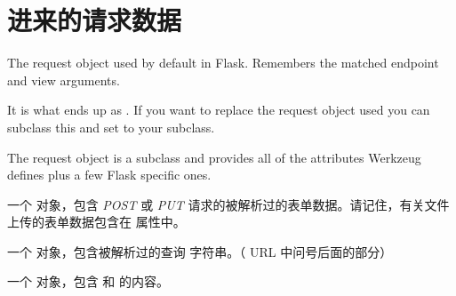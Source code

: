 \documentclass[a4paper,12pt]{sphinxmanual}
\begin{document}
\section{进来的请求数据}
\label{api:id4}

\begin{fulllineitems}
\label{api:flask.Request}
The request object used by default in Flask.  Remembers the
matched endpoint and view arguments.

It is what ends up as {\hyperref[api:flask.request]{}}.  If you want to replace
the request object used you can subclass this and set
{\hyperref[api:flask.Flask.request_class]{}} to your subclass.

The request object is a \href{http://werkzeug.pocoo.org/docs/wrappers/\#werkzeug.wrappers.Request}{} subclass and
provides all of the attributes Werkzeug defines plus a few Flask
specific ones.

\begin{fulllineitems}
\label{api:flask.Request.form}
一个 \href{http://werkzeug.pocoo.org/docs/datastructures/\#werkzeug.datastructures.MultiDict}{} 对象，包含 \emph{POST} 或
\emph{PUT} 请求的被解析过的表单数据。请记住，有关文件上传的表单数据包含在
{\hyperref[api:flask.Request.files]{}} 属性中。

\end{fulllineitems}


\begin{fulllineitems}
\label{api:flask.Request.args}
一个 \href{http://werkzeug.pocoo.org/docs/datastructures/\#werkzeug.datastructures.MultiDict}{} 对象，包含被解析过的查询
字符串。（ URL 中问号后面的部分）

\end{fulllineitems}


\begin{fulllineitems}
\label{api:flask.Request.values}
一个 \href{http://werkzeug.pocoo.org/docs/datastructures/\#werkzeug.datastructures.CombinedMultiDict}{} 对象，包含
{\hyperref[api:flask.Request.form]{}} 和 {\hyperref[api:flask.Request.args]{}} 的内容。


\end{fulllineitems}
\end{fulllineitems}
\end{document}
